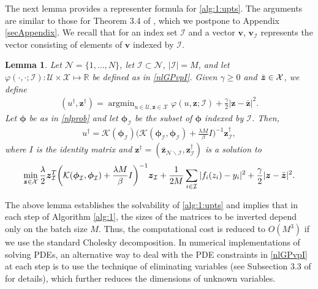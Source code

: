\documentclass[10pt,reqno]{amsart}
\newcommand{\argmin}{\operatorname{argmin}}
\newcommand{\1}{{\chi}}
\def\geq{\geqslant}
\numberwithin{equation}{section}
\theoremstyle{thmlemcorr}
\numberwithin{theorem}{section}
\newtheorem{lemma}[theorem]{Lemma}
\theoremstyle{thmlemcorr*}
\theoremstyle{defi}
\theoremstyle{remexample}
\theoremstyle{ass}
\begin{document}
The next lemma provides a representer formula for \eqref{alg:1:upts}. The arguments are similar to those for Theorem 3.4 of \cite{meng2022sparse}, which we postpone to Appendix \ref{secAppendix}. We recall that for an index set $\mathcal{I}$ and a vector $\boldsymbol{v}$,  $\boldsymbol{v}_{\mathcal{I}}$ represents the vector consisting of elements of $\boldsymbol{v}$ indexed by $\mathcal{I}$. 
\begin{lemma}
	\label{nlreprelm}
	Let $\mathcal{N}=\{1, \dots, N\}$, let $\mathcal{I}\subset \mathcal{N}$, $|\mathcal{I}|=M$,  and let $\varphi(\cdot, \cdot;\mathcal{I}):\mathcal{U}\times\mathcal{X}\mapsto \mathbb{R}$ be defined as in \eqref{nlGPvpI}. Given $\gamma\geq 0$ and $\Bar{\boldsymbol{z}}\in \mathcal{X}$, we define 
	\begin{align}
		\label{nlhproxpr}
		(u^{\dagger}, {\boldsymbol{z}}^{\dagger})=\argmin_{u\in \mathcal{U}, \boldsymbol{z}\in \mathcal{X}}\varphi(u, \boldsymbol{z}; \mathcal{I}) +  \frac{\gamma}{2}|\boldsymbol{z}-\bar{\boldsymbol{z}}|^2. 
	\end{align}
	Let $\boldsymbol{\phi}$ be as in \eqref{nlprob} and let $\boldsymbol{\phi}_{\mathcal{I}}$ be the subset of $\boldsymbol{\phi}$ indexed by $\mathcal{I}$.  Then,
	\begin{align}
		\label{nluzprli}
		u^{\dagger}=\mathcal{K}(\boldsymbol{\phi}_{\mathcal{I}})\bigg(\mathcal{K}(\boldsymbol{\phi}_{\mathcal{I}}, \boldsymbol{\phi}_{\mathcal{I}}) + \frac{\lambda M}{\beta}{I} \bigg)^{-1}\boldsymbol{z}^{\dagger}_{\mathcal{I}}, 
	\end{align}
	where ${I}$ is the identity matrix and  $\boldsymbol{z}^\dagger=(\bar{\boldsymbol{z}}_{\mathcal{N}\backslash\mathcal{I}}, \boldsymbol{z}^\dagger_{\mathcal{I}})$   is a solution to
	\begin{align}
		\label{nlmzp}
		\min_{\boldsymbol{z}\in \mathcal{X}}\frac{\lambda}{2}\boldsymbol{z}^T_{\mathcal{I}}\bigg(\mathcal{K}(\boldsymbol{\phi}_{\mathcal{I}}, \boldsymbol{\phi}_{\mathcal{I}}) + \frac{\lambda M}{\beta}I\bigg)^{-1}\boldsymbol{z}_{\mathcal{I}} + \frac{1}{2M}\sum_{i\in \mathcal{I}}|f_i(z_i) - y_i|^2 +  \frac{\gamma}{2}|\boldsymbol{z}-\Bar{\boldsymbol{z}}|^2. 
	\end{align}
\end{lemma}


The above lemma establishes the solvability of \eqref{alg:1:upts} and implies that in each step of Algorithm \ref{alg:1},  the sizes of the matrices to be inverted depend only on the batch size $M$. Thus, the computational cost is reduced to $O(M^3)$ if we use the standard Cholesky decomposition. In numerical implementations of solving PDEs, an alternative way to deal with the PDE constraints in \eqref{nlGPvpI} at each step is to use the technique of eliminating variables (see Subsection 3.3 of \cite{chen2021solving} for details), which further reduces the dimensions of unknown variables. 
\end{document}
